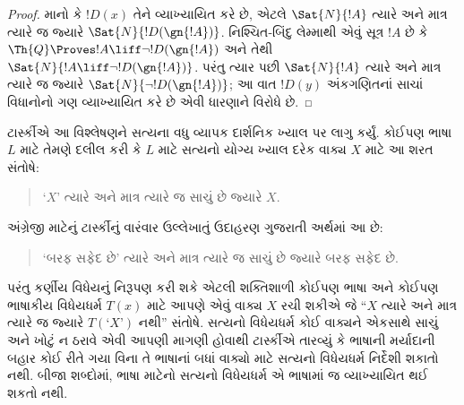 \begin{proof}
માનો કે $!D(x)$ તેને વ્યાખ્યાયિત કરે છે, એટલે $\Sat{N}{!A}$ ત્યારે અને માત્ર ત્યારે જ જ્યારે $\Sat{N}{!D(\gn{!A})}$. નિશ્ચિત-બિંદુ લેમ્માથી એવું સૂત્ર $!A$ છે કે $\Th{Q} \Proves !A \liff \lnot !D(\gn{!A})$ અને તેથી $\Sat{N}{!A \liff \lnot !D(\gn{!A})}$. પરંતુ ત્યાર પછી $\Sat{N}{!A}$ ત્યારે અને માત્ર ત્યારે જ જ્યારે $\Sat{N}{\lnot !D(\gn{!A})}$; આ વાત $!D(y)$ અંકગણિતનાં સાચાં વિધાનોનો ગણ વ્યાખ્યાયિત કરે છે એવી ધારણાને વિરોધે છે.
\end{proof}

ટાર્સ્કીએ આ વિશ્લેષણને સત્યના વધુ વ્યાપક દાર્શનિક ખ્યાલ પર લાગુ કર્યું. કોઈપણ ભાષા $L$ માટે તેમણે દલીલ કરી કે $L$ માટે સત્યનો યોગ્ય ખ્યાલ દરેક વાક્ય $X$ માટે આ શરત સંતોષે:
\begin{quote}
`$X$' ત્યારે અને માત્ર ત્યારે જ સાચું છે જ્યારે $X$.
\end{quote}
અંગ્રેજી માટેનું ટાર્સ્કીનું વારંવાર ઉલ્લેખાતું ઉદાહરણ ગુજરાતી અર્થમાં આ છે:
\begin{quote}
`બરફ સફેદ છે' ત્યારે અને માત્ર ત્યારે જ સાચું છે જ્યારે બરફ સફેદ છે.
\end{quote}
પરંતુ કર્ણીય વિધેયનું નિરૂપણ કરી શકે એટલી શક્તિશાળી કોઈપણ ભાષા અને કોઈપણ ભાષાકીય વિધેયધર્મ $T(x)$ માટે આપણે એવું વાક્ય $X$ રચી શકીએ જે ``$X$ ત્યારે અને માત્ર ત્યારે જ જ્યારે $T(\text{`$X$'})$ નથી'' સંતોષે. સત્યનો વિધેયધર્મ કોઈ વાક્યને એકસાથે સાચું અને ખોટું ન ઠરાવે એવી આપણી માગણી હોવાથી ટાર્સ્કીએ તારવ્યું કે ભાષાની મર્યાદાની બહાર કોઈ રીતે ગયા વિના તે ભાષાનાં બધાં વાક્યો માટે સત્યનો વિધેયધર્મ નિર્દેશી શકાતો નથી. બીજા શબ્દોમાં, ભાષા માટેનો સત્યનો વિધેયધર્મ એ ભાષામાં જ વ્યાખ્યાયિત થઈ શકતો નથી.
\endgroup


\OLEndChapterHook
\endgroup


\OLEndPartHook
